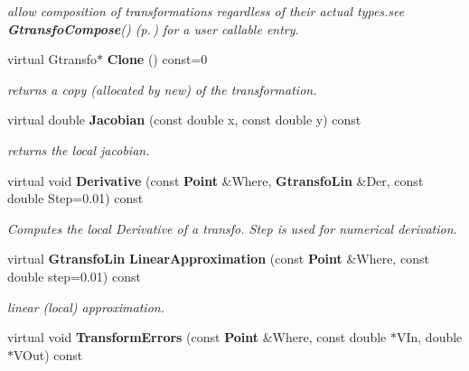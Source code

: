 \begin{CompactItemize}
\begin{CompactList}\small\item\em allow composition of transformations regardless of their actual types.see {\bf Gtransfo\-Compose}() {\rm (p.\,\pageref{gtransfo_h_a1})} for a user callable entry.\item\end{CompactList}\item 
{}
virtual Gtransfo$\ast$ {\bf Clone} () const=0\label{class_gtransfo_a7}

\begin{CompactList}\small\item\em returns a copy (allocated by new) of the transformation.\item\end{CompactList}\item 
{}
virtual double {\bf Jacobian} (const double x, const double y) const\label{class_gtransfo_a8}

\begin{CompactList}\small\item\em returns the local jacobian.\item\end{CompactList}\item 
virtual void {\bf Derivative} (const {\bf Point} \&Where, {\bf Gtransfo\-Lin} \&Der, const double Step=0.01) const
\begin{CompactList}\small\item\em Computes the local Derivative of a transfo. Step is used for numerical derivation.\item\end{CompactList}\item 
{}
virtual {\bf Gtransfo\-Lin} {\bf Linear\-Approximation} (const {\bf Point} \&Where, const double step=0.01) const\label{class_gtransfo_a10}

\begin{CompactList}\small\item\em linear (local) approximation.\item\end{CompactList}\item 
{}
virtual void {\bf Transform\-Errors} (const {\bf Point} \&Where, const double $\ast$VIn, double $\ast$VOut) const\label{class_gtransfo_a11}


\end{CompactItemize}
